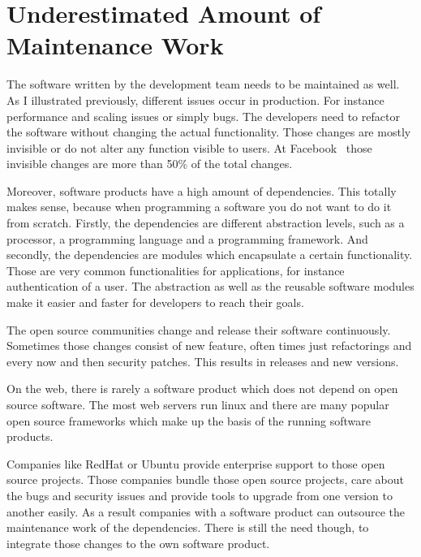 \section{Underestimated Amount of Maintenance Work}

The software written by the development team needs to be maintained as well. As I
illustrated previously, different issues occur in production. For instance performance and
scaling issues or simply bugs. The developers need to refactor the software without
changing the actual functionality. Those changes are mostly invisible or do not alter any
function visible to users. At Facebook~\cite{dev_at_fb} those invisible changes are more
than 50\% of the total changes.

Moreover, software products have a high amount of dependencies. This totally makes sense,
because when programming a software you do not want to do it from scratch. Firstly, the
dependencies are different abstraction levels, such as a processor, a programming language
and a programming framework. And secondly, the dependencies are modules which encapsulate
a certain functionality. Those are very common functionalities for applications, for
instance authentication of a user. The abstraction as well as the reusable software
modules make it easier and faster for developers to reach their goals.

The open source communities change and release their software continuously. Sometimes
those changes consist of new feature, often times just refactorings and every now and then
security patches. This results in releases and new versions.

On the web, there is rarely a software product which does not depend on open source
software. The most web servers run linux and there are many popular open source
frameworks which make up the basis of the running software products.

Companies like RedHat or Ubuntu provide enterprise support to those open source
projects. Those companies bundle those open source projects, care about the bugs and
security issues and provide tools to upgrade from one version to another easily. As a
result companies with a software product can outsource the maintenance work of the
dependencies. There is still the need though, to integrate those changes to the own
software product.


